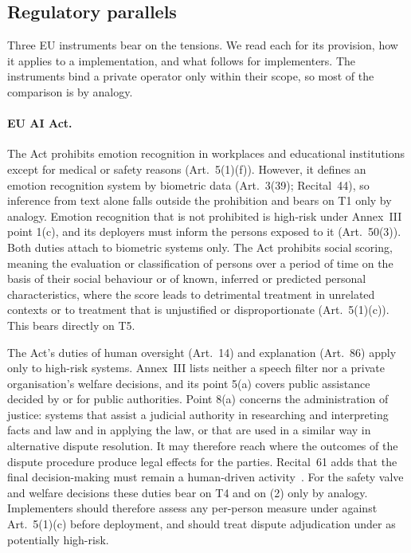 \subsection{Regulatory parallels}
\label{sec:regulatory}

Three EU instruments bear on the tensions. We read each for its provision, how it applies to a \pol{} implementation, and what follows for implementers. The instruments bind a private operator only within their scope, so most of the comparison is by analogy.

\paragraph{EU AI Act.}
The Act prohibits emotion recognition in workplaces and educational institutions except for medical or safety reasons (Art.~5(1)(f)).
However, it defines an emotion recognition system by biometric data (Art.~3(39); Recital~44), so inference from text alone falls outside the prohibition and bears on T1 only by analogy.
Emotion recognition that is not prohibited is high-risk under Annex~III point 1(c), and its deployers must inform the persons exposed to it (Art.~50(3)). Both duties attach to biometric systems only.
The Act prohibits social scoring, meaning the evaluation or classification of persons over a period of time on the basis of their social behaviour or of known, inferred or predicted personal characteristics, where the score leads to detrimental treatment in unrelated contexts or to treatment that is unjustified or disproportionate (Art.~5(1)(c)). This bears directly on T5.

The Act's duties of human oversight (Art.~14) and explanation (Art.~86) apply only to high-risk systems.
Annex~III lists neither a speech filter nor a private organisation's welfare decisions, and its point 5(a) covers public assistance decided by or for public authorities.
Point 8(a) concerns the administration of justice: systems that assist a judicial authority in researching and interpreting facts and law and in applying the law, or that are used in a similar way in alternative dispute resolution. It may therefore reach  where the outcomes of the dispute procedure produce legal effects for the parties. Recital~61 adds that the final decision-making must remain a human-driven activity~\cite{euaiact2024}.
For the safety valve and welfare decisions these duties bear on T4 and on (2) only by analogy.
Implementers should therefore assess any per-person measure under  against Art.~5(1)(c) before deployment, and should treat dispute adjudication under  as potentially high-risk.

